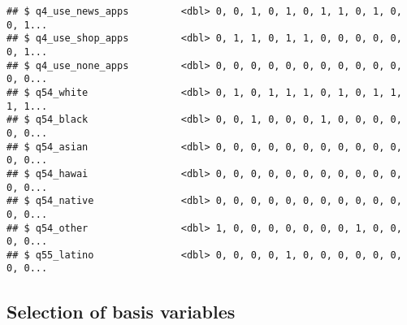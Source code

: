 \documentclass[]{article}
\begin{document}
\begin{verbatim}
## $ q4_use_news_apps         <dbl> 0, 0, 1, 0, 1, 0, 1, 1, 0, 1, 0, 0, 1...
## $ q4_use_shop_apps         <dbl> 0, 1, 1, 0, 1, 1, 0, 0, 0, 0, 0, 0, 1...
## $ q4_use_none_apps         <dbl> 0, 0, 0, 0, 0, 0, 0, 0, 0, 0, 0, 0, 0...
## $ q54_white                <dbl> 0, 1, 0, 1, 1, 1, 0, 1, 0, 1, 1, 1, 1...
## $ q54_black                <dbl> 0, 0, 1, 0, 0, 0, 1, 0, 0, 0, 0, 0, 0...
## $ q54_asian                <dbl> 0, 0, 0, 0, 0, 0, 0, 0, 0, 0, 0, 0, 0...
## $ q54_hawai                <dbl> 0, 0, 0, 0, 0, 0, 0, 0, 0, 0, 0, 0, 0...
## $ q54_native               <dbl> 0, 0, 0, 0, 0, 0, 0, 0, 0, 0, 0, 0, 0...
## $ q54_other                <dbl> 1, 0, 0, 0, 0, 0, 0, 0, 1, 0, 0, 0, 0...
## $ q55_latino               <dbl> 0, 0, 0, 0, 1, 0, 0, 0, 0, 0, 0, 0, 0...
\end{verbatim}

\subsection{Selection of basis
variables}\label{selection-of-basis-variables}
\end{document}
